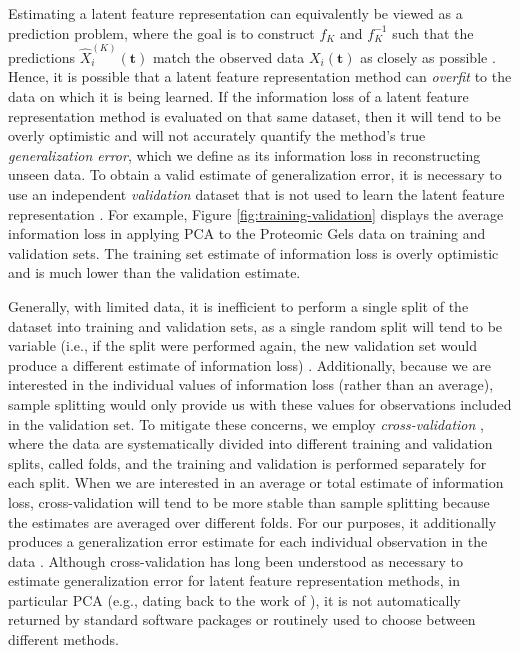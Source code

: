 Estimating a latent feature representation can equivalently be viewed as a prediction problem, where the goal is to construct $f_{K}$ and $f_{K}^{-1}$ such that the predictions $\widehat{X}_i^{(K)}(\mathbf{t})$ match the observed data $X_i(\mathbf{t})$ as closely as possible \parencite{krzanowski_cross-validation_1987, wold_cross-validatory_1978, diana_cross-validation_2002}.
Hence, it is possible that a latent feature representation method can \emph{overfit} to the data on which it is being learned.
If the information loss of a latent feature representation method is evaluated on that same dataset, then it will tend to be overly optimistic and will not accurately quantify the method's true \emph{generalization error}, which we define as its information loss in reconstructing unseen data.
To obtain a valid estimate of generalization error, it is necessary to use an independent \emph{validation} dataset that is not used to learn the latent feature representation \parencite{diana_cross-validation_2002}.
For example, Figure \ref{fig:training-validation} displays the average information loss in applying PCA to the Proteomic Gels data \parencite{morris_pinnacle_2008} on training and validation sets.
The training set estimate of information loss is overly optimistic and is much lower than the validation estimate.


Generally, with limited data, it is inefficient to perform a single split of the dataset into training and validation sets, as a single random split will tend to be variable (i.e., if the split were performed again, the new validation set would produce a different estimate of information loss) \parencite[Table 1]{collins_evaluation_2024}.
Additionally, because we are interested in the individual values of information loss (rather than an average), sample splitting would only provide us with these values for observations included in the validation set. 
To mitigate these concerns, we employ \emph{cross-validation} \parencite{stone_cross-validatory_1974}, where the data are systematically divided into different training and validation splits, called folds, and the training and validation is performed separately for each split.
When we are interested in an average or total estimate of information loss, cross-validation will tend to be more stable than sample splitting because the estimates are averaged over different folds.
For our purposes, it additionally produces a generalization error estimate for each individual observation in the data .
Although cross-validation has long been understood as necessary to estimate generalization error for latent feature representation methods, in particular PCA (e.g., dating back to the work of \textcite{wold_cross-validatory_1978, eastment_cross-validatory_1982, krzanowski_cross-validation_1987}), it is not automatically returned by standard software packages or routinely used  to choose between different methods.

